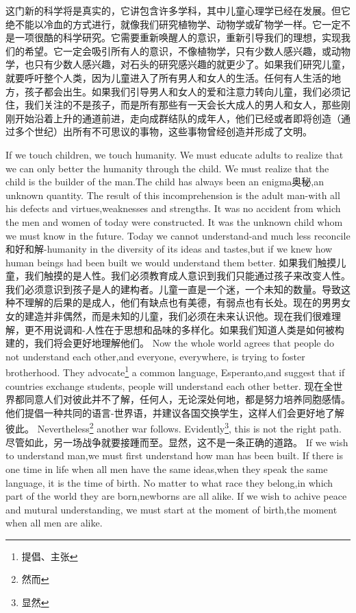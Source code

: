 \documentclass[lang=cn,10pt]{elegantbook}
\begin{document}
这门新的科学将是真实的，它讲包含许多学科，其中儿童心理学已经在发展。但它绝不能以冷血的方式进行，就像我们研究植物学、动物学或矿物学一样。它一定不是一项很酷的科学研究。它需要重新唤醒人的意识，重新引导我们的理想，实现我们的希望。它一定会吸引所有人的意识，不像植物学，只有少数人感兴趣，或动物学，也只有少数人感兴趣，对石头的研究感兴趣的就更少了。如果我们研究儿童，就要呼吁整个人类，因为儿童进入了所有男人和女人的生活。任何有人生活的地方，孩子都会出生。如果我们引导男人和女人的爱和注意力转向儿童，我们必须记住，我们关注的不是孩子，而是所有那些有一天会长大成人的男人和女人，那些刚刚开始沿着上升的通道前进，走向成群结队的成年人，他们已经或者即将创造（通过多个世纪）出所有不可思议的事物，这些事物曾经创造并形成了文明。

If we touch children, we touch humanity. We must educate adults to realize that we can only better the humanity through the child. We must realize that the child is the builder of the man.The child has always been an enigma奥秘,an unknown quantity. The result of this incomprehension is the adult man-with all his defects and virtues,weaknesses and strengths. It was no accident from which the men and women of today were constructed. It was the unknown child whom we must know in the future. Today we cannot understand-and much less reconcile和好和解-humanity in the diversity of its ideas and tastes,but if we knew how human beings had been built we would understand them better.
如果我们触摸儿童，我们触摸的是人性。我们必须教育成人意识到我们只能通过孩子来改变人性。我们必须意识到孩子是人的建构者。儿童一直是一个迷，一个未知的数量。导致这种不理解的后果的是成人，他们有缺点也有美德，有弱点也有长处。现在的男男女女的建造并非偶然，而是未知的儿童，我们必须在未来认识他。现在我们很难理解，更不用说调和-人性在于思想和品味的多样化。如果我们知道人类是如何被构建的，我们将会更好地理解他们。
Now the whole world agrees that people do not understand each other,and everyone, everywhere, is trying to foster brotherhood. They advocate\footnote{提倡、主张} a common language, Esperanto,and suggest that if countries exchange students, people will understand each other better.
现在全世界都同意人们对彼此并不了解，任何人，无论深处何地，都是努力培养同胞感情。他们提倡一种共同的语言-世界语，并建议各国交换学生，这样人们会更好地了解彼此。
Nevertheless\footnote{然而} another war follows. Evidently\footnote{显然}, this is not the right path.
尽管如此，另一场战争就要接踵而至。显然，这不是一条正确的道路。
If we wish to understand man,we must first understand how man has been built. If there is one time in life when all men have the same ideas,when they speak the same language, it is the time of birth. No matter to what race they belong,in which part of the world they are born,newborns are all alike. If we wish to achive peace and mutural understanding, we must start at the moment of birth,the moment when all men are alike.
\end{document}
